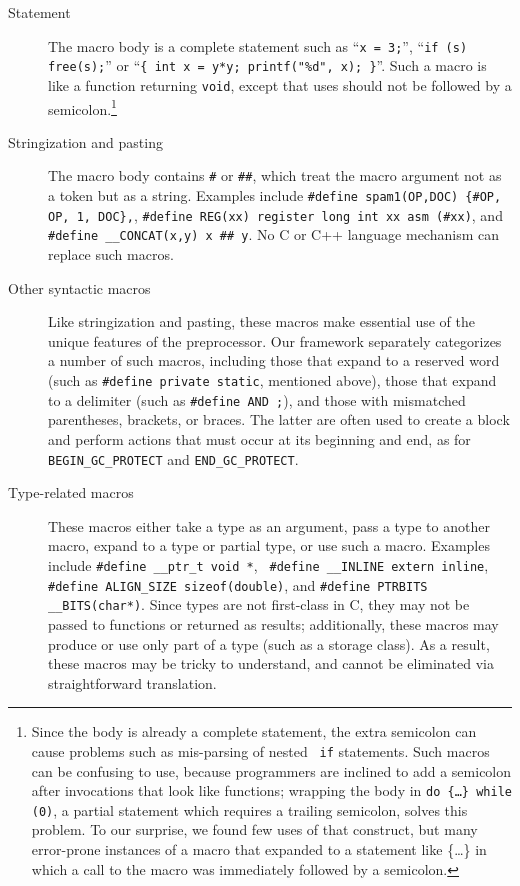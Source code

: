 \documentclass[11pt]{article}
\begin{document}
\begin{description}
\item[Statement]  The macro body is a complete statement such as
  ``{\tt x = 3;}'', ``{\tt if (s) free(s);}'' or ``{\tt \verb|{| int x =
    y*y; printf("\%d", x); \verb|}|}''.  Such a macro is like a function
    returning {\tt void}, except that uses should not be followed by a
    semicolon.\footnote{Since the body is already a complete statement, the
      extra semicolon can cause problems such as mis-parsing of nested {\tt
      if} statements.  Such macros can be confusing to use, because
    programmers are inclined to add a semicolon after invocations that look
    like functions; wrapping the body in {\tt do \{\ldots\} while (0)}, a
    partial statement which requires a trailing semicolon, solves this
    problem.  To our surprise, we found few uses of that construct, but
    many error-prone instances of a macro that expanded to a statement like
    \{\ldots\} in which a call to the macro was immediately followed by a
    semicolon.}

\item[Stringization and pasting]  The macro body contains {\tt \#} or
  {\tt \#\#}, which treat the macro argument not as a token but as a
  string.  Examples include {\tt \#define spam1(OP,DOC) \verb|{|\#OP, OP,
    1, DOC\verb|}|,}, {\tt \#define REG(xx) register long int xx asm
    (\#xx)}, and {\tt \#define \verb|__CONCAT|(x,y) x \#\# y}.  No C or C++
  language mechanism can replace such macros.

\item[Other syntactic macros]  Like stringization and pasting, these
  macros make essential use of the unique features of the preprocessor.
  Our framework separately categorizes a number of such macros, including
  those that expand to a reserved word (such as {\tt \#define private
  static}, mentioned above), those that expand to a delimiter (such as
{\tt \#define AND ;}), and those with mismatched parentheses, brackets, or
braces.  The latter are often used to create a block and perform actions
that must occur at its beginning and end, as for \verb|BEGIN_GC_PROTECT|
and \verb|END_GC_PROTECT|.

\item[Type-related macros]  These macros either take a type as an argument, pass
  a type to another macro, expand to a type or partial type, or use such a
  macro.  Examples include {\tt \#define \verb|__ptr_t| void *}, {\tt
  \#define \verb|__INLINE| extern inline}, {\tt \#define \verb|ALIGN_SIZE|
sizeof(double)}, and {\tt \#define PTRBITS \verb|__BITS|(char*)}.  Since
types are not first-class in C, they may not be passed to functions or
returned as results; additionally, these macros may produce or use only
part of a type (such as a storage class).  As a result, these macros may be
tricky to understand, and cannot be eliminated via straightforward
translation.


\end{description}
\end{document}

